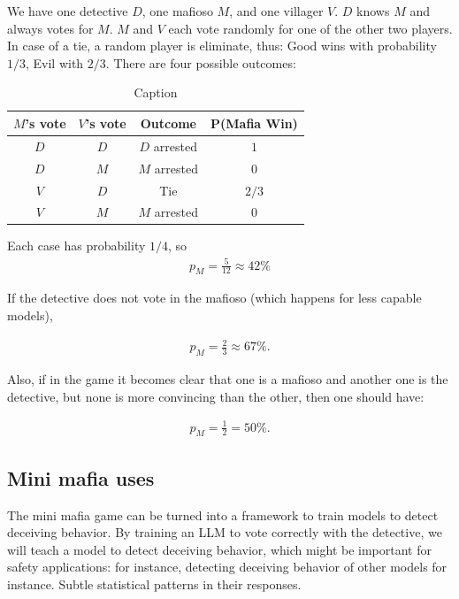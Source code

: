 \documentclass{article}
\begin{document}
We have one detective $D$, one mafioso $M$, and one villager $V$.  
$D$ knows $M$ and always votes for $M$.  
$M$ and $V$ each vote randomly for one of the other two players.  
In case of a tie, a random player is eliminate, thus: Good wins with probability $1/3$, Evil with $2/3$. There are four possible outcomes:
\begin{table}[ht]
    \centering
    \begin{tabular}{|c|c|c|c|}
        \hline
        $M$'s vote & $V$'s vote & Outcome & P(Mafia Win) \\
        \hline
        $D$ & $D$ & $D$ arrested & $1$ \\
        $D$ & $M$ & $M$ arrested & $0$ \\
        $V$ & $D$ & Tie & $2/3$ \\
        $V$ & $M$ & $M$ arrested & $0$ \\
        \hline
    \end{tabular}
    \caption{Caption}
    \label{tab:placeholder}
\end{table}
Each case has probability $1/4$, so
\begin{align}
    p_M=\frac{5}{12}\approx42\%
\end{align}

If the detective does not vote in the mafioso (which happens for less capable models), 

\begin{align}
    p_M=\frac{2}{3}\approx 67\%.
\end{align}

Also, if in the game it becomes clear that one is a mafioso and another one is the detective, but none is more convincing than the other, then one should have:

\begin{align}
    p_M=\frac{1}{2}=50\%.
\end{align}




\subsection{Mini mafia uses}

The mini mafia game can be turned into a framework to train models to detect deceiving behavior. By training an LLM to vote correctly with the detective, we will teach a model to detect deceiving behavior, which might be important for safety applications: for instance, detecting deceiving behavior of other models for instance. Subtle statistical patterns in their responses.
\end{document}
